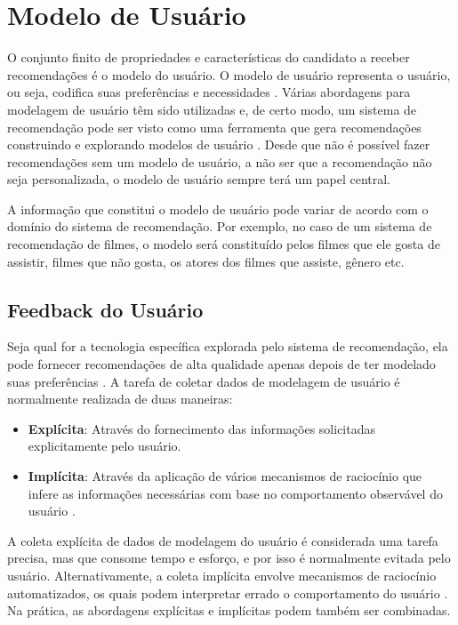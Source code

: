 \chapter{Modelo de Usuário} 
\label{cap:userModel}

O conjunto finito de propriedades e características do candidato a receber recomendações é o modelo do usuário. O modelo de usuário representa o usuário, ou seja, codifica suas preferências e necessidades \citep{ricci2011recommender}. Várias abordagens para modelagem de usuário têm sido utilizadas e, de certo modo, um sistema de recomendação pode ser visto como uma ferramenta que gera recomendações construindo e explorando modelos de usuário \citep{Berkovsky:2009:CMU:1499116.1499121}. Desde que não é possível fazer recomendações sem um modelo de usuário, a não ser que a recomendação não seja personalizada, o modelo de usuário sempre terá um papel central.

A informação que constitui o modelo de usuário pode variar de acordo com o domínio do sistema de recomendação. Por exemplo, no caso de um sistema de recomendação de filmes, o modelo será constituído pelos filmes que ele gosta de assistir, filmes que não gosta, os atores dos filmes que assiste, gênero etc.


\section{Feedback do Usuário}

Seja qual for a tecnologia específica explorada pelo sistema de recomendação, ela pode fornecer recomendações de alta qualidade apenas depois de ter modelado suas preferências \citep{Berkovsky:2008:MUM:1380736.1380749}. A tarefa de coletar dados de modelagem de usuário é normalmente realizada de duas maneiras:

\begin{itemize}
	\item{\textbf{Explícita}: Através do fornecimento das informações solicitadas explicitamente pelo usuário.}
	
	\item{\textbf{Implícita}: Através da aplicação de vários mecanismos de raciocínio que infere as informações necessárias com base no comportamento observável do usuário \citep{Hanani:2001:IFO:598287.598363}.}
\end{itemize}

A coleta explícita de dados de modelagem do usuário é considerada uma tarefa  precisa, mas que consome tempo e esforço, e por isso é normalmente evitada pelo usuário. Alternativamente, a coleta implícita envolve mecanismos de raciocínio automatizados, os quais podem interpretar errado o comportamento do usuário \citep{Berkovsky:2008:MUM:1380736.1380749}. Na prática, as abordagens explícitas e implícitas podem também ser combinadas.

